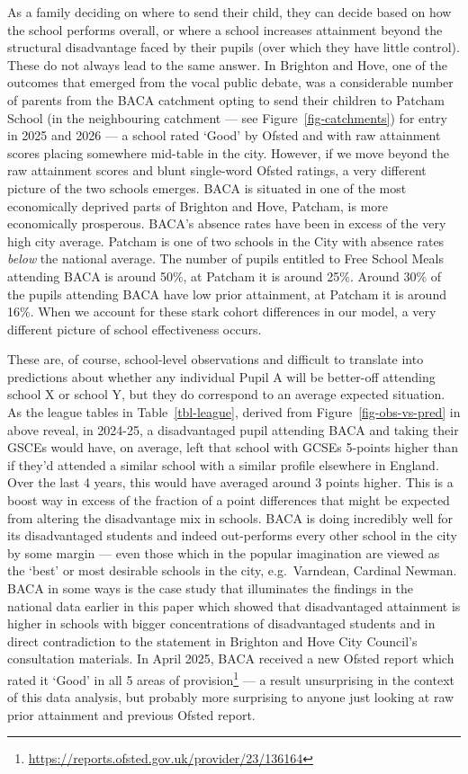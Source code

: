 \documentclass[
  12pt,
  titlepage]{article}
\begin{document}
As a family deciding on where to send their child, they can decide based
on how the school performs overall, or where a school increases
attainment beyond the structural disadvantage faced by their pupils
(over which they have little control). These do not always lead to the
same answer. In Brighton and Hove, one of the outcomes that emerged from
the vocal public debate, was a considerable number of parents from the
BACA catchment opting to send their children to Patcham School (in the
neighbouring catchment --- see Figure~\ref{fig-catchments}) for entry in
2025 and 2026 --- a school rated `Good' by Ofsted and with raw
attainment scores placing somewhere mid-table in the city. However, if
we move beyond the raw attainment scores and blunt single-word Ofsted
ratings, a very different picture of the two schools emerges. BACA is
situated in one of the most economically deprived parts of Brighton and
Hove, Patcham, is more economically prosperous. BACA's absence rates
have been in excess of the very high city average. Patcham is one of two
schools in the City with absence rates \emph{below} the national
average. The number of pupils entitled to Free School Meals attending
BACA is around 50\%, at Patcham it is around 25\%. Around 30\% of the
pupils attending BACA have low prior attainment, at Patcham it is around
16\%. When we account for these stark cohort differences in our model, a
very different picture of school effectiveness occurs.

These are, of course, school-level observations and difficult to
translate into predictions about whether any individual Pupil A will be
better-off attending school X or school Y, but they do correspond to an
average expected situation. As the league tables in
Table~\ref{tbl-league}, derived from Figure~\ref{fig-obs-vs-pred} in
above reveal, in 2024-25, a disadvantaged pupil attending BACA and
taking their GSCEs would have, on average, left that school with GCSEs
5-points higher than if they'd attended a similar school with a similar
profile elsewhere in England. Over the last 4 years, this would have
averaged around 3 points higher. This is a boost way in excess of the
fraction of a point differences that might be expected from altering the
disadvantage mix in schools. BACA is doing incredibly well for its
disadvantaged students and indeed out-performs every other school in the
city by some margin --- even those which in the popular imagination are
viewed as the `best' or most desirable schools in the city,
e.g.~Varndean, Cardinal Newman. BACA in some ways is the case study that
illuminates the findings in the national data earlier in this paper
which showed that disadvantaged attainment is higher in schools with
bigger concentrations of disadvantaged students and in direct
contradiction to the statement in Brighton and Hove City Council's
consultation materials. In April 2025, BACA received a new Ofsted report
which rated it `Good' in all 5 areas of provision\footnote{\url{https://reports.ofsted.gov.uk/provider/23/136164}}
--- a result unsurprising in the context of this data analysis, but
probably more surprising to anyone just looking at raw prior attainment
and previous Ofsted report.
\end{document}

